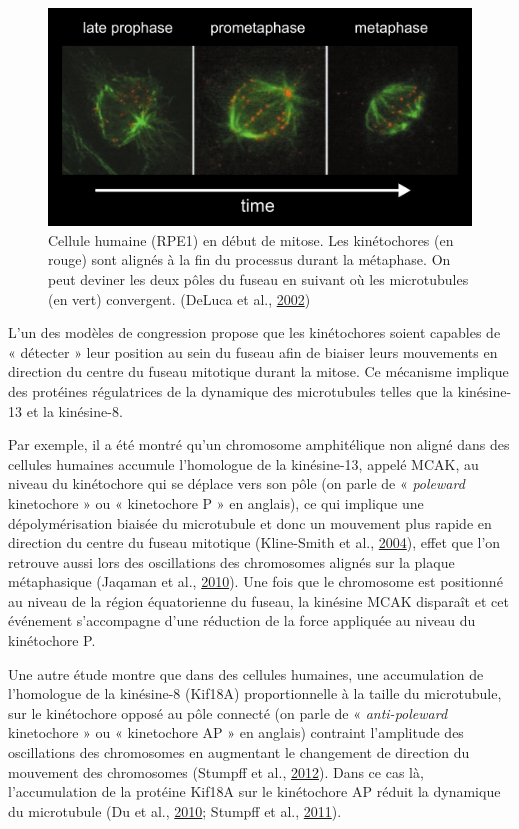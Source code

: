 \documentclass[12pt,a4paper,twoside,openright]{book}
\begin{document}
\begin{figure}[htbp]
\centering
\includegraphics{figures/intro/congression.png}
\caption[Cellule humaine de la prophase à la métaphase]{\label{fig:congression}Cellule
humaine (RPE1) en début de mitose. Les kinétochores (en rouge) sont
alignés à la fin du processus durant la métaphase. On peut deviner les
deux pôles du fuseau en suivant où les microtubules (en vert)
convergent. (DeLuca et al., \hyperref[ref-DeLuca2002]{2002})}
\end{figure}

L'un des modèles de congression propose que les kinétochores soient
capables de « détecter » leur position au sein du fuseau afin de biaiser
leurs mouvements en direction du centre du fuseau mitotique durant la
mitose. Ce mécanisme implique des protéines régulatrices de la dynamique
des microtubules telles que la kinésine-13 et la kinésine-8.

Par exemple, il a été montré qu'un chromosome amphitélique non aligné
dans des cellules humaines accumule l'homologue de la kinésine-13,
appelé MCAK, au niveau du kinétochore qui se déplace vers son pôle (on
parle de « \emph{poleward} kinetochore » ou « kinetochore P » en
anglais), ce qui implique une dépolymérisation biaisée du microtubule et
donc un mouvement plus rapide en direction du centre du fuseau mitotique
(Kline-Smith et al., \hyperref[ref-Kline-Smith2004]{2004}), effet que
l'on retrouve aussi lors des oscillations des chromosomes alignés sur la
plaque métaphasique (Jaqaman et al., \hyperref[ref-Jaqaman2010]{2010}).
Une fois que le chromosome est positionné au niveau de la région
équatorienne du fuseau, la kinésine MCAK disparaît et cet événement
s'accompagne d'une réduction de la force appliquée au niveau du
kinétochore P.

Une autre étude montre que dans des cellules humaines, une accumulation
de l'homologue de la kinésine-8 (Kif18A) proportionnelle à la taille du
microtubule, sur le kinétochore opposé au pôle connecté (on parle de «
\emph{anti-poleward} kinetochore » ou « kinetochore AP » en anglais)
contraint l'amplitude des oscillations des chromosomes en augmentant le
changement de direction du mouvement des chromosomes (Stumpff et al.,
\hyperref[ref-Stumpff2012]{2012}). Dans ce cas là, l'accumulation de la
protéine Kif18A sur le kinétochore AP réduit la dynamique du microtubule
(Du et al., \hyperref[ref-Du2010]{2010}; Stumpff et al.,
\hyperref[ref-Stumpff2011a]{2011}).
\end{document}
